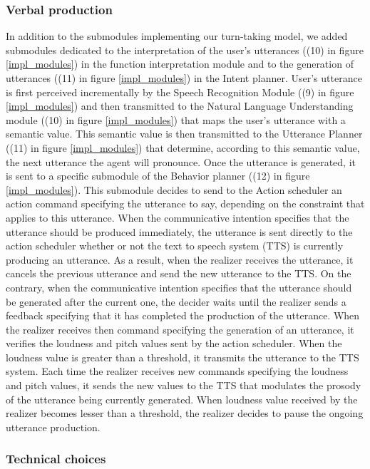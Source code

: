 \subsubsection{Verbal production}

In addition to the submodules implementing our turn-taking model, we added submodules dedicated to the interpretation of the user's utterances ((10) in figure \ref{impl_modules}) in the function interpretation module and to the generation of utterances ((11) in figure \ref{impl_modules}) in the Intent planner. 
User's utterance is first perceived incrementally by the Speech Recognition Module ((9) in figure \ref{impl_modules}) and then  transmitted to the Natural Language Understanding module ((10) in figure \ref{impl_modules}) that maps the user's utterance with a semantic value. This semantic value is then transmitted to the Utterance Planner ((11) in figure \ref{impl_modules}) that determine, according to this semantic value, the next utterance the agent will pronounce.  
Once the utterance is generated, it is sent to a specific submodule of the Behavior planner ((12) in figure \ref{impl_modules}). This submodule decides to send to the Action scheduler an action command specifying the utterance to say, depending on the constraint that applies to this utterance. When the communicative intention specifies that the utterance should be produced immediately, the utterance is sent directly to the action scheduler whether or not the text to speech system (TTS) is currently producing an utterance. As a result, when the realizer receives the utterance, it cancels the previous utterance and send the new utterance to the TTS. On the contrary, when the communicative intention specifies that the utterance should be generated after the current one, the decider waits until the realizer sends a feedback specifying that it has completed the production of the utterance.
When the realizer receives then command specifying the generation of an utterance, it verifies the loudness and pitch values sent by the action scheduler. When the loudness value is greater than a threshold, it transmits the utterance to the TTS system. Each time the realizer receives new commands specifying the loudness and pitch values, it sends the new values to the TTS that modulates the prosody of the utterance being currently generated. When loudness value received by the realizer becomes lesser than a threshold, the realizer decides to pause the ongoing utterance production.

\subsubsection{Technical choices}


